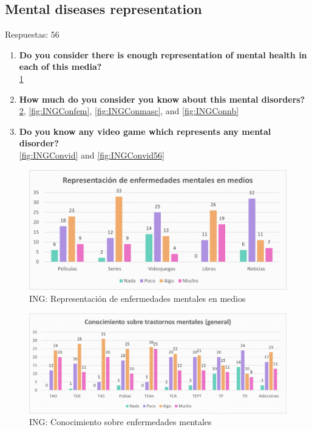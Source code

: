 \documentclass[12pt, a4paper,twoside,titlepage]{book}
\begin{document}
\subsection{Mental diseases representation}
Respuestas: 56
\begin{enumerate}[label=\textbf{\arabic*}.]
     \item \textbf{Do you consider there is enough representation of mental health in each of this media?}\\
     \ref{fig:INGMedios}
     \item \textbf{How much do you consider you know about this mental disorders?}\\
     \ref{fig:INGCon},  \ref{fig:INGConfem}, \ref{fig:INGConmasc}, and
     \ref{fig:INGConnb}
     \item \textbf{Do you know any video game which represents any mental disorder?}\\
      \ref{fig:INGConvid} and \ref{fig:INGConvid56}
\end{enumerate}




\begin{figure}
    \centering
    \includegraphics[width=1\linewidth]{ANEXO ING/7AnexINGMedios}
    \caption{ING: Representación de enfermedades mentales en medios}
    \label{fig:INGMedios}
\end{figure}


\begin{figure}
    \centering
    \includegraphics[width=1\linewidth]{ANEXO ING/8AnexINGCon}
    \caption{ING: Conocimiento sobre enfermedades mentales}
    \label{fig:INGCon}
\end{figure}
\end{document}

